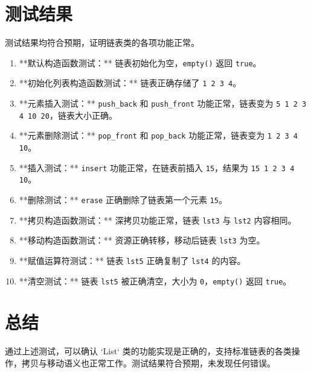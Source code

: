 \documentclass[UTF8]{ctexart}
\begin{document}
\section{测试结果}
测试结果均符合预期，证明链表类的各项功能正常。

\begin{enumerate}
    \item **默认构造函数测试：** 链表初始化为空，\texttt{empty()} 返回 \texttt{true}。
    \item **初始化列表构造函数测试：** 链表正确存储了 \texttt{1 2 3 4}。
    \item **元素插入测试：** \texttt{push\_back} 和 \texttt{push\_front} 功能正常，链表变为 \texttt{5 1 2 3 4 10 20}，链表大小正确。
    \item **元素删除测试：** \texttt{pop\_front} 和 \texttt{pop\_back} 功能正常，链表变为 \texttt{1 2 3 4 10}。
    \item **插入测试：** \texttt{insert} 功能正常，在链表前插入 \texttt{15}，结果为 \texttt{15 1 2 3 4 10}。
    \item **删除测试：** \texttt{erase} 正确删除了链表第一个元素 \texttt{15}。
    \item **拷贝构造函数测试：** 深拷贝功能正常，链表 \texttt{lst3} 与 \texttt{lst2} 内容相同。
    \item **移动构造函数测试：** 资源正确转移，移动后链表 \texttt{lst3} 为空。
    \item **赋值运算符测试：** 链表 \texttt{lst5} 正确复制了 \texttt{lst4} 的内容。
    \item **清空测试：** 链表 \texttt{lst5} 被正确清空，大小为 \texttt{0}，\texttt{empty()} 返回 \texttt{true}。
\end{enumerate}

\section{总结}
通过上述测试，可以确认 `List` 类的功能实现是正确的，支持标准链表的各类操作，拷贝与移动语义也正常工作。测试结果符合预期，未发现任何错误。
\end{document}
